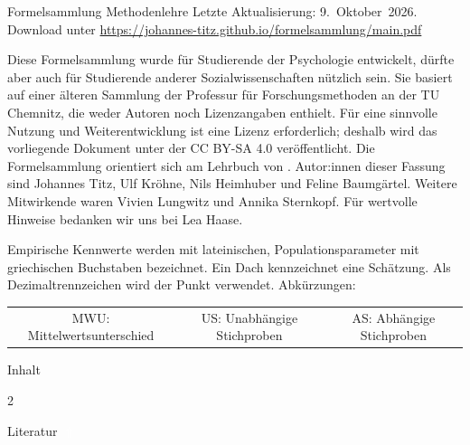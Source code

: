 \documentclass[9pt,a4paper]{article}
\makeatletter
\newcommand{\redaktionsstand}{9.~Oktober~2026}
\newcommand{\zumInhalt}{%
  \hspace{0.6em}\hyperlink{inhalt}{\textcolor{white}{$\Uparrow$}}}
\newcommand{\formelverzeichnis}{\@starttoc{toc}}
\makeatother
\begin{document}
\begin{boxK}{Formelsammlung Methodenlehre}
Letzte Aktualisierung: \redaktionsstand. Download unter \url{https://johannes-titz.github.io/formelsammlung/main.pdf}
\vspace{0.15cm}

Diese Formelsammlung wurde für Studierende der Psychologie entwickelt, dürfte aber auch für Studierende anderer Sozialwissenschaften nützlich sein. Sie basiert auf einer älteren Sammlung der Professur für Forschungsmethoden an der TU Chemnitz, die weder Autoren noch Lizenzangaben enthielt. Für eine sinnvolle Nutzung und Weiterentwicklung ist eine Lizenz erforderlich; deshalb wird das vorliegende Dokument unter der CC BY-SA 4.0 veröffentlicht. Die Formelsammlung orientiert sich am Lehrbuch von \textcite{sedlmeier2024}. Autor:innen dieser Fassung sind Johannes Titz, Ulf Kröhne, Nils Heimhuber und Feline Baumgärtel. Weitere Mitwirkende waren Vivien Lungwitz und Annika Sternkopf. Für wertvolle Hinweise bedanken wir uns bei Lea Haase.
\vspace{0.15cm}

Empirische Kennwerte werden mit lateinischen, Populationsparameter mit griechischen Buchstaben bezeichnet. Ein Dach kennzeichnet eine Schätzung. Als Dezimaltrennzeichen wird der Punkt verwendet. Abkürzungen:

\noindent\begin{tabular}{@{}ccc}
MWU: Mittelwertsunterschied & US: Unabhängige Stichproben & AS: Abhängige Stichproben\\
\end{tabular}
\end{boxK}

\begin{boxK}{Inhalt}
\hypertarget{inhalt}{}%
\begingroup
\small
\setlength{\columnsep}{10pt}
\begin{multicols}{2}
\formelverzeichnis
\end{multicols}
\endgroup
\end{boxK}























\begin{boxK}{Literatur\zumInhalt}
  \printbibliography[heading=none]
\vspace{0.25cm}

\end{boxK}
\end{document}
